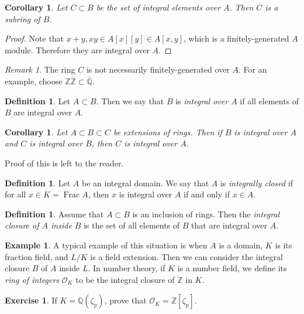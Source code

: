 \documentclass[leqno, openany]{memoir}
\newtheorem{cor}[thm]{Corollary}
\theoremstyle{definition}
\newtheorem{defn}[thm]{Definition}
\newtheorem{exm}[thm]{Example}
\newtheorem{exer}[thm]{Exercise}
\theoremstyle{remark}
\newtheorem{rmk}[thm]{Remark}
\theoremstyle{plain}
\theoremstyle{definition}
\theoremstyle{remark}
\newcommand{\Z}{\mathbb{Z}}
\newcommand{\Q}{\mathbb{Q}}
\newcommand{\mc}[1]{\mathcal{#1}}
\newcommand{\ol}[1]{\overline{#1}}
\begin{document}
\begin{cor} Let $C \subset B$ be the set of integral elements over $A$. Then
$C$ is a subring of $B$.  \end{cor}

\begin{proof} Note that $x + y, xy \in A[x][y] \in A[x,y]$, which is a
finitely-generated $A$ module. Therefore they are integral over $A$.
\end{proof}

\begin{rmk} The ring $C$ is not necessarily finitely-generated over $A$. For an
example, choose $\Z \ol{\Z} \subset \ol{\Q}$.  \end{rmk}

\begin{defn} Let $A \subset B$. Then we say that $B$ is \textit{integral over
$A$} if all elements of $B$ are integral over $A$.  \end{defn}

\begin{cor} Let $A \subset B \subset C$ be extensions of rings. Then if $B$ is
integral over $A$ and $C$ is integral over $B$, then $C$ is integral over $A$.
\end{cor}

Proof of this is left to the reader.

\begin{defn} Let $A$ be an integral domain. We say that $A$ is
\textit{integrally closed} if for all $x \in K = \operatorname{Frac} A$, then
$x$ is integral over $A$ if and only if $x \in A$.  \end{defn}

\begin{defn} Assume that $A \subset B$ is an inclusion of rings. Then the
\textit{integral closure of $A$ inside $B$} is the set of all elements of $B$
that are integral over $A$.  \end{defn}

\begin{exm} A typical example of this situation is when $A$ is a domain, $K$ is
    its fraction field, and $L / K$ is a field extension. Then we can consider
    the integral closure $B$ of $A$ inside $L$. In number theory, if $K$ is a
    number field, we define its \textit{ring of integers} $\mc{O}_K$ to be the
    integral closure of $\Z$ in $K$.  \end{exm}

\begin{exer} If $K = \Q(\zeta_p)$, prove that $\mc{O}_K = \Z[\zeta_p]$.
\end{exer}
\end{document}
